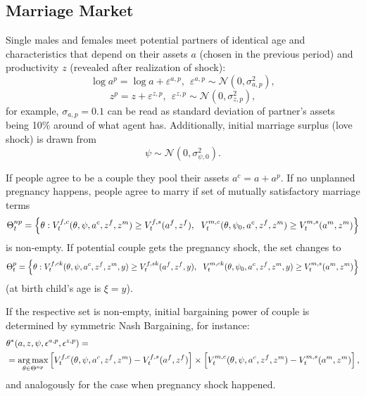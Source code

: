 \subsection{Marriage Market}
Single males and females meet potential partners of identical age and characteristics that depend on their assets $a$ (chosen in the previous period) and productivity $z$ (revealed after realization of shock):
\begin{equation}\log a^p = \log a + \varepsilon^{a,p}, \ \ \varepsilon^{a,p} \sim \mathcal{N}(0,\sigma_{a,p}^2),\end{equation}
\begin{equation}	z^p = z + \varepsilon^{z,p}, \ \ \varepsilon^{z,p} \sim \mathcal{N}(0,\sigma_{z,p}^2),\end{equation}
for example, $\sigma_{a,p} = 0.1$ can be read as standard deviation of partner's assets being 10\% around of what agent has. 
Additionally, initial marriage surplus (love shock) is drawn from
\begin{equation} \psi \sim \mathcal{N}(0,\sigma_{\psi,0}^2).\end{equation}

If people agree to be a couple they pool their assets $a^c = a + a^p$. If no unplanned pregnancy happens, people agree to marry if set of mutually satisfactory marriage terms
\begin{equation}\small \Theta^{np}_t = \left\{ \theta : V_t^{f,c}(\theta,\psi,a^c,z^f,z^m) \geq V_t^{f,s}(a^f,z^f), \ \ V_t^{m,c}(\theta,\psi_0,a^c,z^f,z^m) \geq V_t^{m,s}(a^m,z^m)\right\}\end{equation}
is non-empty. If potential couple gets the pregnancy shock, the set changes to
\begin{equation} \small \Theta^{p}_t = \left\{ \theta : V_t^{f,ck}(\theta,\psi,a^c,z^f,z^m,y) \geq V_t^{f,sk}(a^f,z^f,y), \ \ V_t^{m,ck}(\theta,\psi_0,a^c,z^f,z^m,y) \geq V_t^{m,s}(a^m,z^m)\right\} \end{equation}
(at birth child's age is $\xi = y$).

If the respective set is non-empty, initial bargaining power of couple is determined by symmetric Nash Bargaining, for instance:
\small
\begin{align}&\theta^*(a,z,\psi,\epsilon^{a,p},\epsilon^{z,p}) = \label{nbs} \\ \nonumber &= \operatorname*{\mathrm{arg\,max}}\limits_{\theta \in \Theta^{np}} \left[V_t^{f,c}(\theta,\psi,a^c,z^f,z^m) - V_t^{f,s}(a^f,z^f)\right] \times \left[V_t^{\vphantom{f}m,c}(\theta,\psi,a^c,z^f,z^m) - V_t^{m,s}(a^m,z^m)\right],\end{align}
and analogously for the case when pregnancy shock happened.

